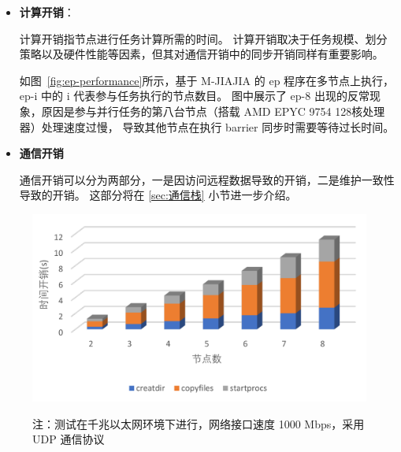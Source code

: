 {\begin{itemize}
              系统初始化开销代表调用 jia\_init() 初始化 M-JIAJIA 系统所耗费的时间。

              程序分发与远程执行产生的通信开销是系统初始化过程中最主要的性能瓶颈，一部分原因是
              当前M-JIAJIA采用的基于SCP（Secure Copy）的程序分发和SSH（Secure Shell）远程执行机制并不高效，
              其单线程串行传输模式导致分发时间随集群规模扩大呈线性增长（如图~\ref{fig:time-create-procs}所示）。

              另一部分系统初始化开销是RDMA通信栈的初始化，这部分的开销如图~\ref{fig:time-init-rdma-comm}所示。
              目前已有研究~\citep{guo2024secm}尝试在建连阶段以流水线方式同时执行多个连接设置以降低该部分的开销。

        \item \textbf{计算开销}：

              计算开销指节点进行任务计算所需的时间。
              计算开销取决于任务规模、划分策略以及硬件性能等因素，但其对通信开销中的同步开销同样有重要影响。

              如图~\ref{fig:ep-performance}所示，基于 M-JIAJIA 的 ep 程序在多节点上执行，ep-i 中的 i 代表参与任务执行的节点数目。
              图中展示了 ep-8 出现的反常现象，原因是参与并行任务的第八台节点（搭载 AMD EPYC 9754 128核处理器）处理速度过慢，
              导致其他节点在执行 barrier 同步时需要等待过长时间。

        \item \textbf{通信开销}

              通信开销可以分为两部分，一是因访问远程数据导致的开销，二是维护一致性导致的开销。
              这部分将在 \ref{sec:通信栈} 小节进一步介绍。

    \end{itemize}

    \begin{figure}
        \centering
        \includegraphics[width=0.85\linewidth]{Img/程序不同集群规模开销.pdf}
        \label{fig:time-create-procs}
        {\footnotesize \par 注：测试在千兆以太网环境下进行，网络接口速度 1000 Mbps，采用 UDP 通信协议}
    \end{figure}

}
